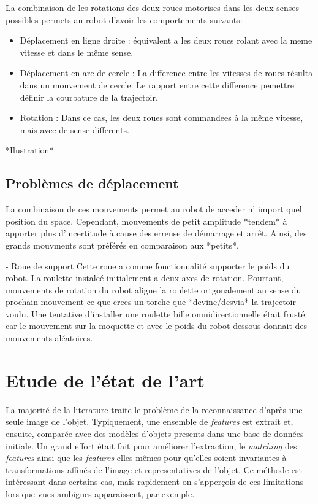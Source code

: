 La combinaison de les rotations des deux roues motorises dans les deux senses possibles permets au robot d'avoir les comportements suivants: 

\begin {itemize}
    \item Déplacement en ligne droite : équivalent a les deux roues rolant avec la meme vitesse et dans le même sense.

    \item Déplacement en arc de cercle : La difference entre les vitesses de roues résulta dans un mouvement de cercle. Le rapport entre cette difference pemettre définir la courbature de la trajectoir.

    \item Rotation : Dans ce cas, les deux roues sont commandees à la même vitesse, mais avec de sense differents.
\end{itemize}

*Ilustration*

\subsection{Problèmes de déplacement}
La combinaison de ces mouvements permet au robot de acceder n' import quel position du space. Cependant, mouvements de petit amplitude *tendem* à apporter plus d'incertitude à cause des erreuse de démarrage et arrêt. Ainsi, des grands mouvments sont préférés en comparaison aux *petits*.

- Roue de support
Cette roue a comme fonctionnalité supporter le poids du robot. La roulette instaleé initialement a  deux axes de rotation. Pourtant, mouvements de rotation du robot aligne la roulette ortgonalement au sense du prochain mouvement ce que crees un torche que *devine/desvia* la trajectoir voulu. Une tentative d'installer une roulette bille omnidirectionnelle était frusté car le mouvement sur la moquette et avec le poids du robot dessous donnait des mouvements aléatoires.

\section{Etude de l'état de l'art}
La majorité de la literature traite le problème de la reconnaissance d'après une seule image de l'objet. Typiquement, une ensemble de \textit{features} est extrait et, ensuite, comparée avec des modèles d'objets presents dans une base de données initiale. Un grand effort était fait pour améliorer l'extraction, le \textit{matching} des \textit{features} ainsi que les \textit{features} elles mêmes pour qu'elles soient invariantes à transformations affinés de l'image et representatives de l'objet.
Ce méthode est intéressant dans certains cas, mais rapidement on s'apperçois de ces limitations lors que vues ambigues apparaissent, par exemple.

